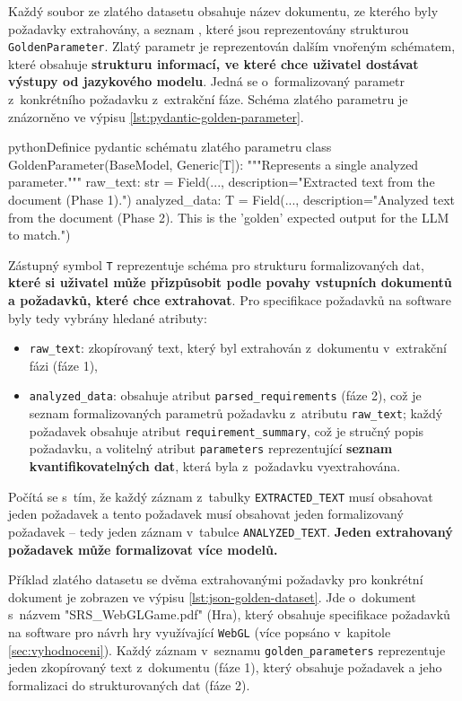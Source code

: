 \documentclass[czech, bc, kiv, he, iso690numb, pdf]{fasthesis}
\newcommand{\nobreakstart}
{
    \nopagebreak
    \begin{center}
        \begin{minipage}{\textwidth}  
}
\newcommand{\nobreakend}{
        \end{minipage}
    \end{center}
}
\begin{document}
Každý soubor ze zlatého datasetu obsahuje název dokumentu, ze kterého byly požadavky extrahovány, a seznam , které jsou reprezentovány strukturou \verb"GoldenParameter". Zlatý parametr je reprezentován dalším vnořeným  schématem, které obsahuje \textbf{strukturu informací, ve které chce uživatel dostávat výstupy od jazykového modelu}. Jedná se o~formalizovaný parametr z~konkrétního požadavku z~extrakční fáze. Schéma zlatého parametru je znázorněno ve výpisu \ref{lst:pydantic-golden-parameter}.

\nobreakstart
        \begin{code}{python}{Definice pydantic schématu zlatého parametru\label{lst:pydantic-golden-parameter}}
            class GoldenParameter(BaseModel, Generic[T]):
            """Represents a single analyzed parameter."""
            raw_text: str = Field(..., description="Extracted text from the document (Phase 1).")
            analyzed_data: T = Field(..., description="Analyzed text from the document (Phase 2). This is the 'golden' expected output for the LLM to match.")
        \end{code}
\nobreakend

Zástupný symbol \verb"T" reprezentuje schéma pro strukturu formalizovaných dat, \textbf{které si uživatel může přizpůsobit podle povahy vstupních dokumentů a požadavků, které chce extrahovat}. Pro specifikace požadavků na software byly tedy vybrány hledané atributy:
\begin{itemize}
    \item \verb"raw_text": zkopírovaný text, který byl extrahován z~dokumentu v~extrakční fázi (fáze 1),
    \item \verb"analyzed_data": obsahuje atribut \verb"parsed_requirements" (fáze 2), což je seznam formalizovaných parametrů požadavku z~atributu \verb"raw_text"; každý požadavek obsahuje atribut \verb"requirement_summary", což je stručný popis požadavku, a volitelný atribut \verb"parameters" reprezentující \textbf{seznam kvantifikovatelných dat}, která byla z~požadavku vyextrahována.
\end{itemize}
Počítá se s~tím, že každý záznam z~tabulky \verb"EXTRACTED_TEXT" musí obsahovat jeden požadavek a tento požadavek musí obsahovat jeden formalizovaný požadavek -- tedy jeden záznam v~tabulce \verb"ANALYZED_TEXT". \textbf{Jeden extrahovaný požadavek může formalizovat více modelů.}

Příklad zlatého datasetu se dvěma extrahovanými požadavky pro konkrétní dokument je zobrazen ve výpisu \ref{lst:json-golden-dataset}. Jde o~dokument s~názvem \filename"SRS_WebGLGame.pdf" (Hra), který obsahuje specifikace požadavků na software pro návrh hry využívající \verb"WebGL" (více popsáno v~kapitole \ref{sec:vyhodnoceni}). Každý záznam v~seznamu \verb"golden_parameters" reprezentuje jeden zkopírovaný text z~dokumentu (fáze 1), který obsahuje požadavek a jeho formalizaci do strukturovaných dat (fáze 2).
\end{document}
